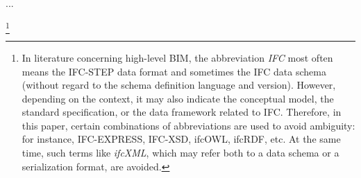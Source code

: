 
 








...



\footnote{
In literature concerning high-level BIM, the abbreviation \emph{IFC} most often means the IFC-STEP data format and sometimes the IFC data schema (without regard to the schema definition language and version).
However, depending on the context, it may also indicate the conceptual model, the standard specification, or the data framework related to IFC.
Therefore, in this paper, certain combinations of abbreviations are used to avoid ambiguity: for instance, IFC-EXPRESS, IFC-XSD, ifcOWL, ifcRDF, etc.
At the same time, such terms like \emph{ifcXML}, which may refer both to a data schema or a serialization format, are avoided.
}















